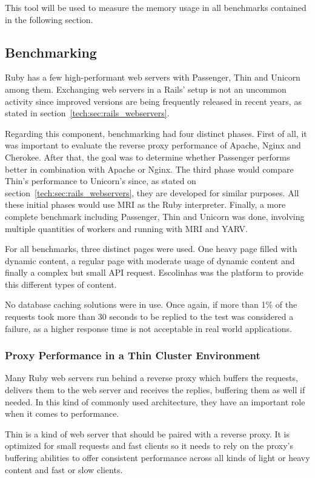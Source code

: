 This tool will be used to measure the memory usage in all benchmarks contained in the following section.

\subsection{Benchmarking}
Ruby has a few high-performant web servers with Passenger, Thin and Unicorn among them. Exchanging web servers in a Rails' setup is not an uncommon activity since improved versions are being frequently released in recent years, as stated in section~\ref{tech:sec:rails_webservers}.

Regarding this component, benchmarking had four distinct phases. First of all, it was important to evaluate the reverse proxy performance of Apache, Nginx and Cherokee. After that, the goal was to determine whether Passenger performs better in combination with Apache or Nginx. The third phase would compare Thin's performance to Unicorn's since, as stated on section~\ref{tech:sec:rails_webservers}, they are developed for similar purposes. All these initial phases would use MRI as the Ruby interpreter. Finally, a more complete benchmark including Passenger, Thin and Unicorn was done, involving multiple quantities of workers and running with MRI and YARV.

For all benchmarks, three distinct pages were used. One heavy page filled with dynamic content, a regular page with moderate usage of dynamic content and finally a complex but small API request. Escolinhas was the platform to provide this different types of content.

No database caching solutions were in use. Once again, if more than 1\% of the requests took more than 30 seconds to be replied to the test was considered a failure, as a higher response time is not acceptable in real world applications.

\subsubsection{Proxy Performance in a Thin Cluster Environment}
Many Ruby web servers run behind a reverse proxy which buffers the requests, delivers them to the web server and receives the replies, buffering them as well if needed. In this kind of commonly used architecture, they have an important role when it comes to performance.

Thin is a kind of web server that should be paired with a reverse proxy. It is optimized for small requests and fast clients so it needs to rely on the proxy's buffering abilities to offer consistent performance across all kinds of light or heavy content and fast or slow clients.

